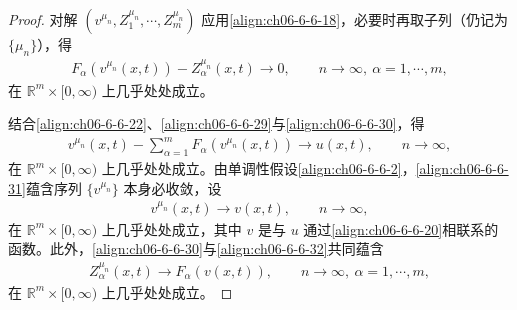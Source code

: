 \documentclass[../../main.tex]{subfiles}
\begin{document}
\begin{proof}
对解 $(v^{\mu_{n}},Z_{1}^{\mu_{n}},\cdots,Z_{m}^{\mu_{n}})$ 应用\eqref{align:ch06-6-6-18}，必要时再取子列（仍记为 $\{\mu_{n}\}$），得
\begin{align}
F_{\alpha}(v^{\mu_{n}}(x,t))-Z_{\alpha}^{\mu_{n}}(x,t)\to 0,\qquad n\to\infty,\ \alpha=1,\cdots,m,
\label{align:ch06-6-6-30}
\end{align}
在 $\mathbb{R}^{m}\times[0,\infty)$ 上几乎处处成立。

结合\eqref{align:ch06-6-6-22}、\eqref{align:ch06-6-6-29}与\eqref{align:ch06-6-6-30}，得
\begin{align}
v^{\mu_{n}}(x,t)-\sum_{\alpha=1}^{m}F_{\alpha}(v^{\mu_{n}}(x,t))\to u(x,t),\qquad n\to\infty,
\label{align:ch06-6-6-31}
\end{align}
在 $\mathbb{R}^{m}\times[0,\infty)$ 上几乎处处成立。由单调性假设\eqref{align:ch06-6-6-2}，\eqref{align:ch06-6-6-31}蕴含序列 $\{v^{\mu_{n}}\}$ 本身必收敛，设
\begin{align}
v^{\mu_{n}}(x,t)\to v(x,t),\qquad n\to\infty,
\label{align:ch06-6-6-32}
\end{align}
在 $\mathbb{R}^{m}\times[0,\infty)$ 上几乎处处成立，其中 $v$ 是与 $u$ 通过\eqref{align:ch06-6-6-20}相联系的函数。此外，\eqref{align:ch06-6-6-30}与\eqref{align:ch06-6-6-32}共同蕴含
\begin{align}
Z_{\alpha}^{\mu_{n}}(x,t)\to F_{\alpha}(v(x,t)),\qquad n\to\infty,\ \alpha=1,\cdots,m,
\label{align:ch06-6-6-33}
\end{align}
在 $\mathbb{R}^{m}\times[0,\infty)$ 上几乎处处成立。


\end{proof}
\end{document}
